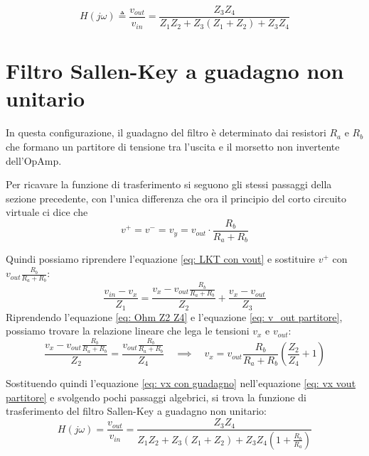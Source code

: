 \begin{equation}
    H(j\omega) \triangleq \frac{v_{out}}{v_{in}} = \frac{Z_3Z_4}{Z_1Z_2+Z_3(Z_1+Z_2)+Z_3Z_4}
    \label{eq: Guadagno Sallen Key}
\end{equation}







\section{Filtro Sallen-Key a guadagno non unitario}

\SallenKeyK

In questa configurazione, il guadagno del filtro è determinato dai resistori $R_a$ e $R_b$ che formano un partitore di tensione tra l'uscita e il morsetto non invertente dell'OpAmp.

Per ricavare la funzione di trasferimento si seguono gli stessi passaggi della sezione precedente, con l'unica differenza che ora il principio del corto circuito virtuale ci dice che 
\begin{equation}
    v^+ = v^- = v_y = v_{out}\cdot\frac{R_b}{R_a + R_b}
    \label{eq: v_out partitore}
\end{equation}

Quindi possiamo riprendere l'equazione \ref{eq: LKT con vout} e sostituire \(v^+\) con \(v_{out}\frac{R_b}{R_a + R_b}\):
\begin{equation}
        \frac{v_{in} - v_x}{Z_1} = \frac{v_x-v_{out}\frac{R_b}{R_a + R_b}}{Z_2} + \frac{v_x - v_{out}}{Z_3}
        \label{eq: vx vout partitore}
\end{equation}
Riprendendo l'equazione \ref{eq: Ohm Z2 Z4} e l'equazione \ref{eq: v_out partitore}, possiamo trovare la relazione lineare che lega le tensioni $v_x$ e $v_{out}$:
\begin{equation}
    \frac{v_x-v_{out}\frac{R_b}{R_a + R_b}}{Z_2} = \frac{v_{out}\frac{R_b}{R_a + R_b}}{Z_4} \quad\implies\quad v_x = v_{out}\frac{R_b}{R_a + R_b}\left(\frac{Z_2}{Z_4}+1\right)
    \label{eq: vx con guadagno}
\end{equation}

Sostituendo quindi l'equazione \ref{eq: vx con guadagno} nell'equazione \ref{eq: vx vout partitore} e svolgendo pochi passaggi algebrici, si trova la funzione di trasferimento del filtro Sallen-Key a guadagno non unitario:
\begin{equation}
    H(j\omega) = \frac{v_{out}}{v_{in}} = \frac{Z_3Z_4}{Z_1Z_2+Z_3(Z_1+Z_2)+Z_3Z_4\left(1+\frac{R_b}{R_a}\right)}
    \label{eq: Guadagno Sallen Key non unitario}
\end{equation}


